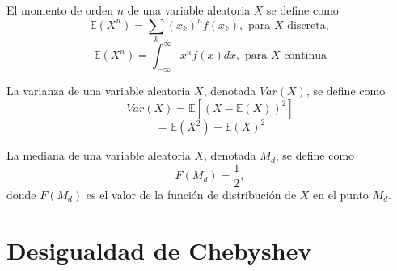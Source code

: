 \begin{defn}
El momento de orden $n$ de una variable aleatoria $X$ se define como \[ \mathbb{E}(X^n) = \sum_k (x_k)^nf(x_k) ,\text{ para $X$ discreta} ,\] \[ \mathbb{E}(X^n) = \int_{-\infty}^\infty x^nf(x)dx ,\text{ para $X$ continua}\]
\end{defn}

\begin{defn}[Varianza]
La varianza de una variable aleatoria $X$, denotada $Var(X)$, se define como  \[ Var(X) = \mathbb{E}[(X - \mathbb{E}(X))^2] \] \[ = \mathbb{E}(X^2) - \mathbb{E}(X)^2\]
\end{defn}

\begin{defn}[Mediana]
La mediana de una variable aleatoria $X$, denotada $M_d$, se define como \[ F(M_d) = \frac{1}{2} ,\] donde $F(M_d)$ es el valor de la función de distribución de $X$ en el punto $M_d$.
\end{defn}

\begin{ejr}

\end{ejr}

\begin{ejr}

\end{ejr}

\begin{ejr}

\end{ejr}

\begin{ejr}

\end{ejr}

\begin{ejr}

\end{ejr}

\begin{ejr}

\end{ejr}

\section{Desigualdad de Chebyshev}

